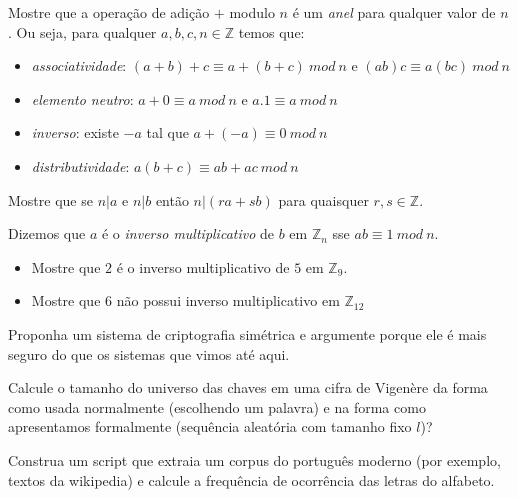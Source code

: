 
\begin{exercicio}
  Mostre que a operação de adição $+$ modulo $n$ é um {\em anel} para qualquer valor de $n$.
Ou seja, para qualquer $a, b, c, n \in \mathbb{Z}$ temos que:
\begin{itemize}
\item {\em associatividade}: $(a+b)+c \equiv a+(b+c)\ mod\ n$ e $(ab)c \equiv a(bc)\ mod\ n$
\item {\em elemento neutro}: $a + 0 \equiv a\ mod\ n$ e $a.1 \equiv a\ mod\ n$
\item {\em inverso}: existe $-a$ tal que $a + (-a) \equiv 0\ mod\ n$
\item {\em distributividade}: $a(b + c) \equiv ab + ac\ mod\ n$
\end{itemize}
\end{exercicio}

\begin{exercicio}
  Mostre que se $n|a$ e $n|b$ então $n|(ra + sb)$ para quaisquer $r, s \in \mathbb{Z}$.
\end{exercicio}

\begin{exercicio}
  Dizemos que $a$ é o {\em inverso multiplicativo} de $b$ em $\mathbb{Z}_n$ sse $ab \equiv 1\ mod\ n$.
\begin{itemize}
\item Mostre que $2$ é o inverso multiplicativo de $5$ em $\mathbb{Z}_9$.
\item Mostre que $6$ não possui inverso multiplicativo em $\mathbb{Z}_{12}$
\end{itemize}
\end{exercicio}

\begin{exercicio}
  Proponha um sistema de criptografia simétrica e argumente porque ele é mais seguro do que os sistemas que vimos até aqui.
\end{exercicio}

\begin{exercicio}
Calcule o tamanho do universo das chaves em uma cifra de Vigenère da forma como usada normalmente (escolhendo um palavra) e na forma como apresentamos formalmente (sequência aleatória com tamanho fixo $l$)?
\end{exercicio}


\begin{exercicio}
Construa um script que extraia um corpus do português moderno (por exemplo, textos da wikipedia) e calcule a frequência de ocorrência das letras do alfabeto.
\end{exercicio}

